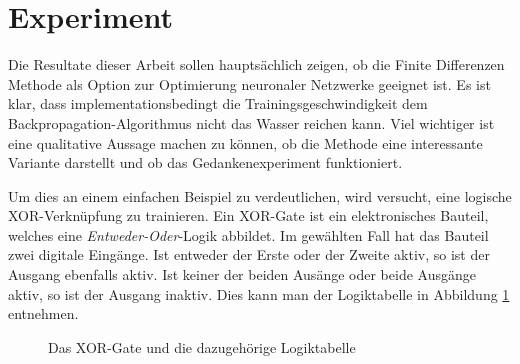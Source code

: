 \section{Experiment
	\label{ableitung:section:resultate}}
Die Resultate dieser Arbeit sollen hauptsächlich zeigen, ob die
Finite Differenzen Methode als Option zur Optimierung neuronaler
Netzwerke geeignet ist.
Es ist klar, dass implementationsbedingt die Trainingsgeschwindigkeit dem Backpropagation-Algorithmus nicht das Wasser reichen kann.
Viel wichtiger ist eine qualitative Aussage machen zu können, ob die Methode eine interessante Variante darstellt und ob das Gedankenexperiment funktioniert.

Um dies an einem einfachen Beispiel zu verdeutlichen, wird versucht,
eine logische XOR-Verknüpfung zu trainieren.
Ein XOR-Gate ist ein elektronisches Bauteil, welches eine
{\em Entweder-Oder}-Logik abbildet.
%
Im gewählten Fall hat das Bauteil zwei digitale Eingänge.
Ist entweder der Erste oder der Zweite aktiv, so ist der Ausgang
ebenfalls aktiv.
Ist keiner der beiden Ausänge oder beide Ausgänge aktiv,
so ist der Ausgang inaktiv.
Dies kann man der Logiktabelle in Abbildung \ref{ableitung:fig:xor-gate-logic} entnehmen.
%
\begin{figure}[h]
	 \centering
	\caption{Das XOR-Gate und die dazugehörige Logiktabelle}
	\label{ableitung:fig:xor-gate-logic}
\end{figure}
